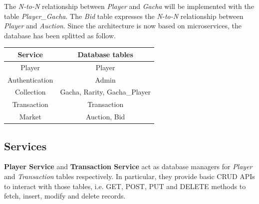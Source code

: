 \documentclass{article}
\begin{document}
The \emph{N-to-N} relationship between \emph{Player} and \emph{Gacha} will be implemented with the table \emph{Player\_Gacha}. The \emph{Bid} table expresses the \emph{N-to-N} relationship between \emph{Player} and \emph{Auction}. Since the architecture is now based on microservices, the database has been splitted as follow.
\begin{table}[ht!]
    \centering
    \begin{tabular}{|c|c|}
        \hline
        \textbf{Service} & \textbf{Database tables}     \\
        \hline
        Player           & Player                       \\
        Authentication   & Admin                        \\
        Collection       & Gacha, Rarity, Gacha\_Player \\
        Transaction      & Transaction                  \\
        Market           & Auction, Bid                 \\
        \hline
    \end{tabular}
\end{table}


\subsection{Services}
\textbf{Player Service} and \textbf{Transaction Service} act as database managers for \emph{Player} and \emph{Transaction} tables respectively. In particular, they provide basic CRUD APIs to interact with those tables, i.e. GET, POST, PUT and DELETE methods to fetch, insert, modify and delete records.
\end{document}
